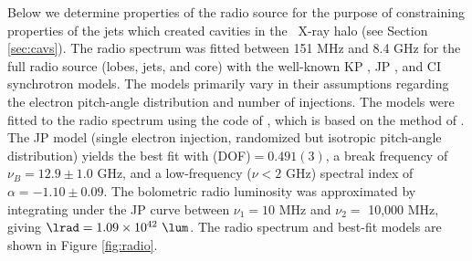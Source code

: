\documentclass[useAMS,usenatbib]{mn2e}
\begin{document}
Below we determine properties of the radio source for the purpose of
constraining properties of the jets which created cavities in the
\rxj\ X-ray halo (see Section \ref{sec:cavs}). The radio spectrum was
fitted between 151 MHz and 8.4 GHz for the full radio source (lobes,
jets, and core) with the well-known KP \citep{1962SvA.....6..317K,
  pach}, JP \citep{1973A&A....26..423J}, and CI
\citep{1987MNRAS.225..335H} synchrotron models. The models primarily
vary in their assumptions regarding the electron pitch-angle
distribution and number of injections. The models were fitted to the
radio spectrum using the code of \citet{2005ApJ...624..656W}, which is
based on the method of \citet{1991ApJ...383..554C}. The JP model
(single electron injection, randomized but isotropic pitch-angle
distribution) yields the best fit with \chisq(DOF)$ = 0.491(3)$, a
break frequency of $\nu_B = 12.9 \pm 1.0$ GHz, and a low-frequency
($\nu < 2$ GHz) spectral index of $\alpha = -1.10 \pm 0.09$. The
bolometric radio luminosity was approximated by integrating under the
JP curve between $\nu_1 = 10$ MHz and $\nu_2 =$ 10,000 MHz, giving
$\lrad = 1.09 \times 10^{42}~\lum$. The radio spectrum and best-fit
models are shown in Figure \ref{fig:radio}.
\end{document}
